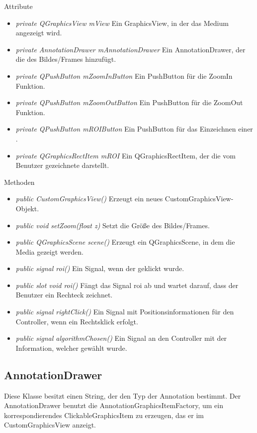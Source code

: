 Attribute
\begin{itemize}
	\item\textit{private QGraphicsView mView} 
	Ein GraphicsView, in der das Medium angezeigt wird. 
	\item\textit{private AnnotationDrawer mAnnotationDrawer} 
	Ein AnnotationDrawer, der die  des Bildes/Frames hinzufügt. 
	\item\textit{private QPushButton mZoomInButton} 
	Ein PushButton für die ZoomIn Funktion. 
	\item\textit{private QPushButton mZoomOutButton} 
	Ein PushButton für die ZoomOut Funktion.
	\item\textit{private QPushButton mROIButton} 
	Ein PushButton für das Einzeichnen einer .
	\item\textit{private QGraphicsRectItem mROI} 
	Ein QGraphicsRectItem, der die vom Benutzer gezeichnete  darstellt.
\end{itemize}

Methoden
\begin{itemize}
	\item\textit{public CustomGraphicsView()} 
	Erzeugt ein neues CustomGraphicsView-Objekt.
	\item\textit{public void setZoom(float z)} 
	Setzt die Größe des Bildes/Frames.
	\item\textit{public QGraphicsScene scene()} 
	Erzeugt ein QGraphicsScene, in dem die Media gezeigt werden.
	\item\textit{public signal roi()} 
	Ein Signal, wenn der  geklickt wurde.
	\item\textit{public slot void roi()} 
	Fängt das Signal roi ab und wartet darauf, dass der Benutzer ein Rechteck zeichnet.
	\item\textit{public signal rightClick()} 
	Ein Signal mit Positionsinformationen für den Controller, wenn ein Rechtsklick erfolgt. 
	\item\textit{public signal algorithmChosen()} 
	Ein Signal an den Controller mit der Information, welcher  gewählt wurde.
\end{itemize}

\subsection*{AnnotationDrawer}
Diese Klasse besitzt einen String, der den Typ der \gls{Annotation} bestimmt. Der AnnotationDrawer benutzt die AnnotationGraphicsItemFactory, um ein korrespondierendes ClickableGraphicsItem zu erzeugen, das er im CustomGraphicsView anzeigt.

